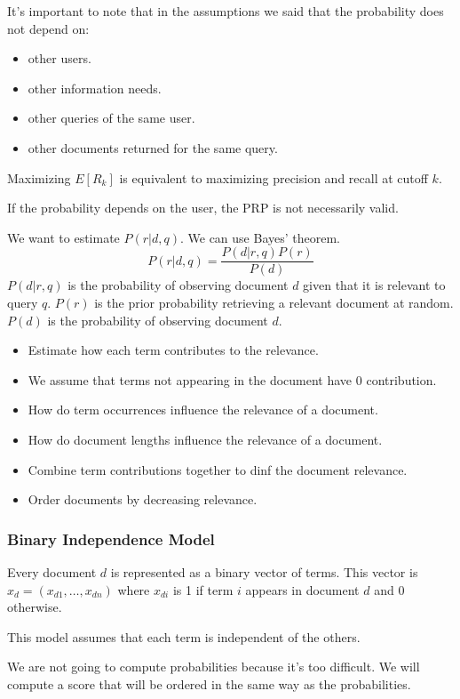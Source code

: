 It's important to note that in the assumptions we said that
the probability does not depend on:
\begin{itemize}
    \item other users.
    \item other information needs.
    \item other queries of the same user.
    \item other documents returned for the same query.
\end{itemize}

Maximizing $E[R_k]$ is equivalent to maximizing precision and recall
at cutoff $k$.

If the probability depends on the user, the PRP is not necessarily valid.

We want to estimate $P(r|d,q)$. We can use Bayes' theorem.
\[
    P(r|d,q) = \frac{P(d|r,q)P(r)}{P(d)}
\]
$P(d|r,q)$ is the probability of observing document $d$ given that
it is relevant to query $q$.
$P(r)$ is the prior probability retrieving a relevant document at random.
$P(d)$ is the probability of observing document $d$.
\begin{itemize}
    \item Estimate how each term contributes to the relevance.
    \item We assume that terms not appearing in the document have 0 contribution.
    \item How do term occurrences influence the relevance of a document.
    \item How do document lengths influence the relevance of a document.
    \item Combine term contributions together to dinf the document relevance.
    \item Order documents by decreasing relevance.
\end{itemize}

\subsubsection{Binary Independence Model}
\label{sec:binary_independence_model}

Every document $d$ is represented as a binary vector of terms.
This vector is $x_d = (x_{d1},\dots,x_{dn})$ where $x_{di}$ is 1 if
term $i$ appears in document $d$ and 0 otherwise.

This model assumes that each term is independent of the others.

We are not going to compute probabilities because it's too difficult.
We will compute a score that will be ordered in the same way as the
probabilities.

